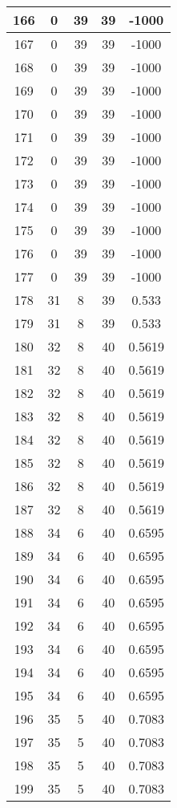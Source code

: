 \documentclass[letterpaper, 12pt]{article}
\begin{document}
\begin{longtable}{|c|c|c|c|c|}
\hline
166 & 0 & 39 & 39 & -1000 \\
\hline
167 & 0 & 39 & 39 & -1000 \\
\hline
168 & 0 & 39 & 39 & -1000 \\
\hline
169 & 0 & 39 & 39 & -1000 \\
\hline
170 & 0 & 39 & 39 & -1000 \\
\hline
171 & 0 & 39 & 39 & -1000 \\
\hline
172 & 0 & 39 & 39 & -1000 \\
\hline
173 & 0 & 39 & 39 & -1000 \\
\hline
174 & 0 & 39 & 39 & -1000 \\
\hline
175 & 0 & 39 & 39 & -1000 \\
\hline
176 & 0 & 39 & 39 & -1000 \\
\hline
177 & 0 & 39 & 39 & -1000 \\
\hline
178 & 31 & 8 & 39 & 0.533 \\
\hline
179 & 31 & 8 & 39 & 0.533 \\
\hline
180 & 32 & 8 & 40 & 0.5619 \\
\hline
181 & 32 & 8 & 40 & 0.5619 \\
\hline
182 & 32 & 8 & 40 & 0.5619 \\
\hline
183 & 32 & 8 & 40 & 0.5619 \\
\hline
184 & 32 & 8 & 40 & 0.5619 \\
\hline
185 & 32 & 8 & 40 & 0.5619 \\
\hline
186 & 32 & 8 & 40 & 0.5619 \\
\hline
187 & 32 & 8 & 40 & 0.5619 \\
\hline
188 & 34 & 6 & 40 & 0.6595 \\
\hline
189 & 34 & 6 & 40 & 0.6595 \\
\hline
190 & 34 & 6 & 40 & 0.6595 \\
\hline
191 & 34 & 6 & 40 & 0.6595 \\
\hline
192 & 34 & 6 & 40 & 0.6595 \\
\hline
193 & 34 & 6 & 40 & 0.6595 \\
\hline
194 & 34 & 6 & 40 & 0.6595 \\
\hline
195 & 34 & 6 & 40 & 0.6595 \\
\hline
196 & 35 & 5 & 40 & 0.7083 \\
\hline
197 & 35 & 5 & 40 & 0.7083 \\
\hline
198 & 35 & 5 & 40 & 0.7083 \\
\hline
199 & 35 & 5 & 40 & 0.7083 \\
\hline
\end{longtable}
\end{document}
